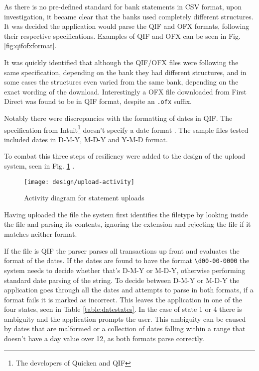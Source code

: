 As there is no pre-defined standard for bank statements in CSV format, upon investigation, it became clear that the banks used completely different structures. It was decided the application would parse the QIF and OFX formats, following their respective specifications. Examples of QIF and OFX can be seen in Fig. \ref{fig:qifofxformat}.

It was quickly identified that although the QIF/OFX files were following the same specification, depending on the bank they had different structures, and in some cases the structures even varied from the same bank, depending on the exact wording of the download. Interestingly a OFX file downloaded from First Direct was found to be in QIF format, despite an \lstinline$.ofx$ suffix.

Notably there were discrepancies with the formatting of dates in QIF. The specification from Intuit\footnote{The developers of Quicken and QIF} doesn't specify a date format \cite{quiken2010qif}. The sample files tested included dates in D-M-Y, M-D-Y and Y-M-D format.



To combat this three steps of resiliency were added to the design of the upload system, seen in Fig. \ref{fig:fileupload} .

\begin{figure}[h]
    \centering
    \texttt{[image: design/upload-activity]}
    \caption{Activity diagram for statement uploads}
    \label{fig:fileupload}
    
    \begin{comment}
(start)->(Upload File)->(Identify File Format)-><a>[QIF]->(Identify Date Format)->(Parse Transactions),
<a>[OFX]->(Parse Transactions)->(Remove Duplicates)->(end),
<a>[Other]->(Reject Upload)
    \end{comment}
\end{figure}

Having uploaded the file the system first identifies the filetype by looking inside the file and parsing its contents, ignoring the extension and rejecting the file if it matches neither format.

If the file is QIF the parser parses all transactions up front and evaluates the format of the dates. If the dates are found to have the format \lstinline$\d00-00-0000$ the system needs to decide whether that's D-M-Y or M-D-Y, otherwise performing standard date parsing of the string.
%
To decide between D-M-Y or M-D-Y the application goes through all the dates and attempts to parse in both formats, if a format fails it is marked as incorrect. This leaves the application in one of the four states, seen in Table \ref{table:datestates}. In the case of state 1 or 4 there is ambiguity and the application prompts the user. This ambiguity can be caused by dates that are malformed or a collection of dates falling within a range that doesn't have a day value over 12, as both formats parse correctly. 

